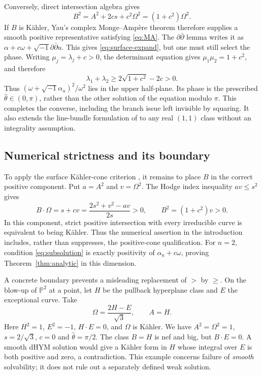 \documentclass[12pt,reqno]{amsart}
\newcommand{\ii}{\sqrt{-1}}
\newcommand{\ddc}{\ii\partial\bar\partial}
\newcommand{\hth}{\widehat\theta}
\begin{document}
Conversely, direct intersection algebra gives
\begin{equation}\label{eq:volume}
 B^2=A^2+2cs+c^2\Omega^2=(1+c^2)\Omega^2.
\end{equation}
If $B$ is K\"ahler, Yau's complex Monge--Amp\`ere theorem \cite{Yau} therefore supplies a smooth positive representative satisfying \eqref{eq:MA}. The $\partial\bar\partial$ lemma writes it as $\alpha+c\omega+\ddc u$. This gives \eqref{eq:surface-expand}, but one must still select the phase. Writing $\mu_j=\lambda_j+c>0$, the determinant equation gives $\mu_1\mu_2=1+c^2$, and therefore
\begin{equation}\label{eq:branch-back}
 \lambda_1+\lambda_2\geq2\sqrt{1+c^2}-2c>0.
\end{equation}
Thus $(\omega+\ii\alpha_u)^2/\omega^2$ lies in the upper half-plane. Its phase is the prescribed $\hth\in(0,\pi)$, rather than the other solution of the equation modulo $\pi$. This completes the converse, including the branch issue left invisible by squaring. It also extends the line-bundle formulation of \cite{JY} to any real $(1,1)$ class without an integrality assumption.

\subsection{Numerical strictness and its boundary}
To apply the surface K\"ahler-cone criterion \cite{DP}, it remains to place $B$ in the correct positive component. Put $a=A^2$ and $v=\Omega^2$. The Hodge index inequality $av\leq s^2$ gives
\[
 B\cdot\Omega=s+cv
   =\frac{2s^2+v^2-av}{2s}>0,
 \qquad B^2=(1+c^2)v>0.
\]
In this component, strict positive intersection with every irreducible curve is equivalent to being K\"ahler. Thus the numerical assertion in the introduction includes, rather than suppresses, the positive-cone qualification. For $n=2$, condition \eqref{eq:subsolution} is exactly positivity of $\alpha_{\underline u}+c\omega$, proving Theorem~\ref{thm:analytic} in this dimension.

A concrete boundary prevents a misleading replacement of $>$ by $\geq$. On the blow-up of $\mathbb P^2$ at a point, let $H$ be the pullback hyperplane class and $E$ the exceptional curve. Take
\[
 \Omega=\frac{2H-E}{\sqrt3},\qquad A=H.
\]
Here $H^2=1$, $E^2=-1$, $H\cdot E=0$, and $\Omega$ is K\"ahler. We have $A^2=\Omega^2=1$, $s=2/\sqrt3$, $c=0$ and $\hth=\pi/2$. The class $B=H$ is nef and big, but $B\cdot E=0$. A smooth dHYM solution would give a K\"ahler form in $H$ whose integral over $E$ is both positive and zero, a contradiction. This example concerns failure of \emph{smooth} solvability; it does not rule out a separately defined weak solution.
\end{document}
